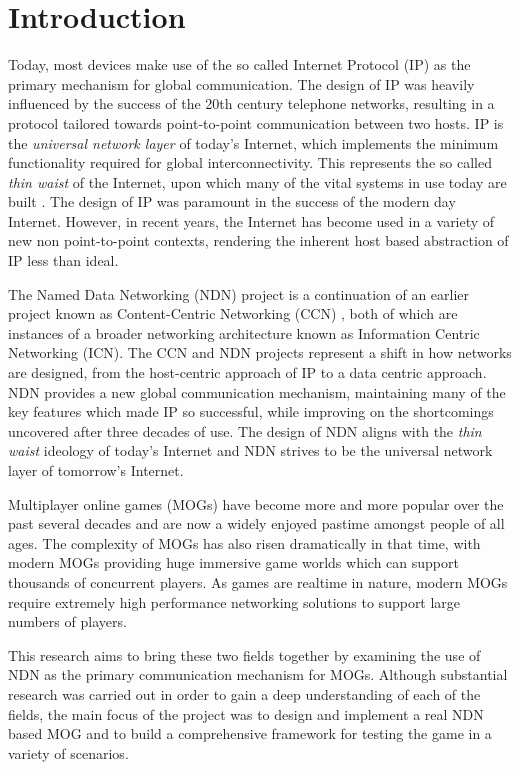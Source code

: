 \documentclass[journal]{IEEEtran}
\begin{document}
\section{Introduction}
Today, most devices make use of the so called Internet Protocol (IP) as the primary mechanism for global communication. The design of IP was heavily influenced by the success of the 20th century telephone networks, resulting in a protocol tailored towards point-to-point communication between two hosts. IP is the \textit{universal network layer} of today's Internet, which implements the minimum functionality required for global interconnectivity. This represents the so called \textit{thin waist} of the Internet, upon which many of the vital systems in use today are built \cite{ndn-exec-summary}. The design of IP was paramount in the success of the modern day Internet. However, in recent years, the Internet has become used in a variety of new non point-to-point contexts, rendering the inherent host based abstraction of IP less than ideal.  

The Named Data Networking (NDN) project is a continuation of an earlier project known as Content-Centric Networking (CCN) \cite{vj-named-content}, both of which are instances of a broader networking architecture known as Information Centric Networking (ICN). The CCN and NDN projects represent a shift in how networks are designed, from the host-centric approach of IP to a data centric approach. NDN provides a new global communication mechanism, maintaining many of the key features which made IP so successful, while improving on the shortcomings uncovered after three decades of use. The design of NDN aligns with the \textit{thin waist} ideology of today's Internet and NDN strives to be the universal network layer of tomorrow's Internet. 

Multiplayer online games (MOGs) have become more and more popular over the past several decades and are now a widely enjoyed pastime amongst people of all ages. The complexity of MOGs has also risen dramatically in that time, with modern MOGs providing huge immersive game worlds which can support thousands of concurrent players. As games are realtime in nature, modern MOGs require extremely high performance networking solutions to support large numbers of players.


This research aims to bring these two fields together by examining the use of NDN as the primary communication mechanism for MOGs. Although substantial research was carried out in order to gain a deep understanding of each of the fields, the main focus of the project was to design and implement a real NDN based MOG and to build a comprehensive framework for testing the game in a variety of scenarios.    
\end{document}
